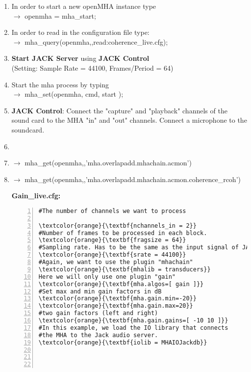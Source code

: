 \documentclass[11pt,a4paper,twoside]{article}
\newcommand{\+}{\discretionary{\mbox{\scriptsize$\hookleftarrow$}}{}{}}
\begin{document}
\begin{enumerate}
\item In order to start a new openMHA instance type \\
  $\rightarrow$ {\ttfamily openmha = mha\_start;}
\item In order to read in the configuration file type: \\
  $\rightarrow$ {\ttfamily mha\_query(openmha,\textquotesingle{}\textquotesingle{},\textquotesingle{}read:coherence\_live.cfg\textquotesingle{});}
\item \textbf{Start JACK Server} using \textbf{JACK Control}\\
  (Setting: Sample Rate = 44100, Frames/Period = 64)
\item Start the mha process by typing \\ $\rightarrow$
  {\ttfamily mha\_set(openmha, \textquotesingle{}cmd\textquotesingle{},
                      \textquotesingle{}start\textquotesingle{} );}
\item \textbf{JACK Control}: Connect the "capture" and "playback" channels
  of the sound card to the MHA "in" and "out" channels.
  Connect a microphone to the soundcard.
\item 
\item $\rightarrow$ {\ttfamily mha\_get(openmha,\textquotesingle{}\textquotesingle{},\textquotesingle{}'mha.overlapadd.mhachain.acmon')}
\item $\rightarrow$ {\ttfamily mha\_get(openmha,\textquotesingle{}\textquotesingle{},\textquotesingle{}'mha.overlapadd.mhachain.acmon.coherence\_rcoh')}

\textbf{Gain\_live.cfg:}

\begin{Verbatim}[frame=single,numbers=left,commandchars=\\\{\}]
#The number of channels we want to process

\textcolor{orange}{\textbf{nchannels_in = 2}}
#Number of frames to be processed in each block.
\textcolor{orange}{\textbf{fragsize = 64}}
#Sampling rate. Has to be the same as the input signal of JACK
\textcolor{orange}{\textbf{srate = 44100}}
#Again, we want to use the plugin "mhachain"
\textcolor{orange}{\textbf{mhalib = transducers}}
Here we will only use one plugin "gain"
\textcolor{orange}{\textbf{mha.algos=[ gain ]}}
#Set max and min gain factors in dB
\textcolor{orange}{\textbf{mha.gain.min=-20}}
\textcolor{orange}{\textbf{mha.gain.max=20}}
#two gain factors (left and right)
\textcolor{orange}{\textbf{mha.gain.gains=[ -10 10 ]}}
#In this example, we load the IO library that connects
#the MHA to the Jack audio server.
\textcolor{orange}{\textbf{iolib = MHAIOJackdb}}




\end{Verbatim}
\end{enumerate}
\end{document}
